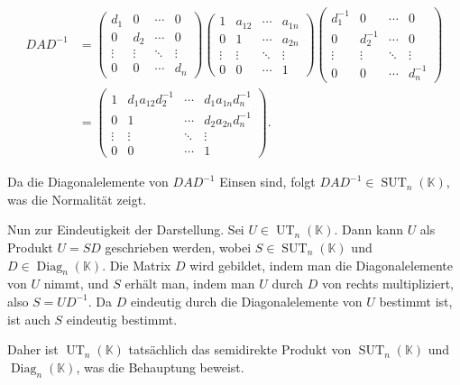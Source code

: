 \begin{align*}
DAD^{-1} &= \begin{pmatrix}
d_1 & 0 & \cdots & 0 \\
0 & d_2 & \cdots & 0 \\
\vdots & \vdots & \ddots & \vdots \\
0 & 0 & \cdots & d_n
\end{pmatrix}
\begin{pmatrix}
1 & a_{12} & \cdots & a_{1n} \\
0 & 1 & \cdots & a_{2n} \\
\vdots & \vdots & \ddots & \vdots \\
0 & 0 & \cdots & 1
\end{pmatrix}
\begin{pmatrix}
d_1^{-1} & 0 & \cdots & 0 \\
0 & d_2^{-1} & \cdots & 0 \\
\vdots & \vdots & \ddots & \vdots \\
0 & 0 & \cdots & d_n^{-1}
\end{pmatrix} \\
&= \begin{pmatrix}
1 & d_1 a_{12} d_2^{-1} & \cdots & d_1 a_{1n} d_n^{-1} \\
0 & 1 & \cdots & d_2 a_{2n} d_n^{-1} \\
\vdots & \vdots & \ddots & \vdots \\
0 & 0 & \cdots & 1
\end{pmatrix}.
\end{align*}

Da die Diagonalelemente von $DAD^{-1}$ Einsen sind, folgt $DAD^{-1} \in \operatorname{SUT}_n(\mathbb{K})$, was die Normalität zeigt.

Nun zur Eindeutigkeit der Darstellung. Sei $U \in \operatorname{UT}_n(\mathbb{K})$. Dann kann $U$ als Produkt $U = SD$ geschrieben werden, wobei $S \in \operatorname{SUT}_n(\mathbb{K})$ und $D \in \operatorname{Diag}_n(\mathbb{K})$. Die Matrix $D$ wird gebildet, indem man die Diagonalelemente von $U$ nimmt, und $S$ erhält man, indem man $U$ durch $D$ von rechts multipliziert, also $S = UD^{-1}$. Da $D$ eindeutig durch die Diagonalelemente von $U$ bestimmt ist, ist auch $S$ eindeutig bestimmt.

Daher ist $\operatorname{UT}_n(\mathbb{K})$ tatsächlich das semidirekte Produkt von $\operatorname{SUT}_n(\mathbb{K})$ und $\operatorname{Diag}_n(\mathbb{K})$, was die Behauptung beweist.

